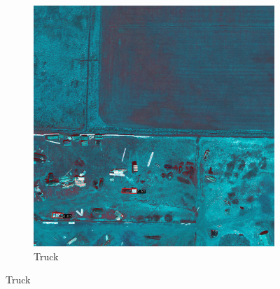 \begin{figure}[h!]
\begin{subfigure}[t]{0.38\textwidth}
        \includegraphics[width=\linewidth]{images/015Results/02perm_exp/comp_images/gbndvi/212.png}
        \caption{Truck}
    \end{subfigure}
    

\end{figure}

